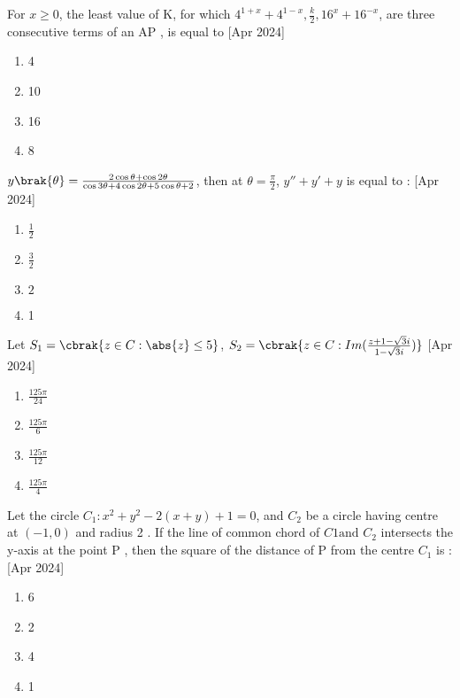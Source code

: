     \item For $x\geq 0$, the least value of K, for which $4^{1+x} +4^{1-x}, \frac{k}{2}, 16^x +16^{-x}$, are three consecutive terms of an AP , is equal to
     \hfill{[Apr 2024]}
\begin{multicols}{4}
            \begin{enumerate}
              \item 4
              \item 10
              \item 16
              \item 8
            \end{enumerate}
        \end{multicols}
    \item $y\brak{\theta}=\frac{2\cos{\theta}+\cos{2\theta}}{\cos{3\theta}+4\cos{2\theta}+5\cos{\theta}+2}$, then at $\theta=\frac{\pi}{2}$, $y''+y'+y$ is equal to :
     \hfill{[Apr 2024]}
    \begin{multicols}{4}
            \begin{enumerate}
              \item $\frac{1}{2}$
              \item $\frac{3}{2}$
              \item $2$
              \item 1
            \end{enumerate}
        \end{multicols}
    \item Let $S_1=\cbrak{z \in C: \abs{z}\leq 5}$, $S_2=\cbrak{z \in C :Im(\frac{z+1-\sqrt{3}i}{1-\sqrt{3}i})}$
     \hfill{[Apr 2024]}
    \begin{multicols}{4}
            \begin{enumerate}
              \item $\frac{125\pi}{24}$
              \item $\frac{125\pi}{6}$
              \item $\frac{125\pi}{12}$
              \item $\frac{125\pi}{4}$
            \end{enumerate}
        \end{multicols}

    \item Let the circle $C_1: x^2+y^2-2(x+y)+1=0$, and $C_2$ be a circle having centre at $(-1,0)$ and radius 2 . If the line of common chord of $C1 \text{and } C_2$ intersects the y-axis at the point P , then the square of the distance of P from the centre $C_1$ is :
      \hfill{[Apr 2024]}
    \begin{multicols}{4}
            \begin{enumerate}
              \item 6
              \item 2
              \item 4
              \item 1
            \end{enumerate}
        \end{multicols}



